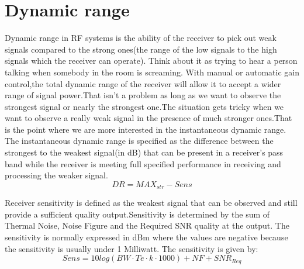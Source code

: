 \section{Dynamic range}
Dynamic range in RF systems is the ability of the receiver to pick out weak signals compared to the strong ones(the range of the low signals to the high signals which the receiver can operate). Think about it as trying to hear a person talking when somebody in the room is screaming.  
With manual or automatic gain control,the total dynamic range of the receiver will allow it to accept a wider range of signal power.That isn't a problem as long as we want to observe the strongest signal or nearly the strongest one.The situation gets tricky when we want to observe a really weak signal in the presence of much stronger ones.That is the point where we are more interested in the instantaneous dynamic range.
The instantaneous dynamic range is specified as the difference between the strongest to the weakest signal(in dB) that can be present in a receiver's pass band while the receiver is meeting full specified performance in receiving and processing the weaker signal\citep{DyR}.
\begin{equation}
DR = MAX_{str} -Sens
\label{Dynamic_range_def}
\end{equation}

\begin{where}
\end{where}




Receiver sensitivity is defined as the weakest signal that can be observed and still provide a sufficient quality output.Sensitivity is determined by the sum of Thermal Noise, Noise Figure and the Required SNR quality at the output. The sensitivity is normally expressed in dBm where the values are negative because the sensitivity is usually under 1 Milliwatt. The sensitivity is given by:
\begin{equation}
Sens = 10log(BW\cdot Te\cdot k\cdot 1000) + NF + SNR_{Req}
\label{Noise1}
\end{equation}
\begin{where}
\end{where}



